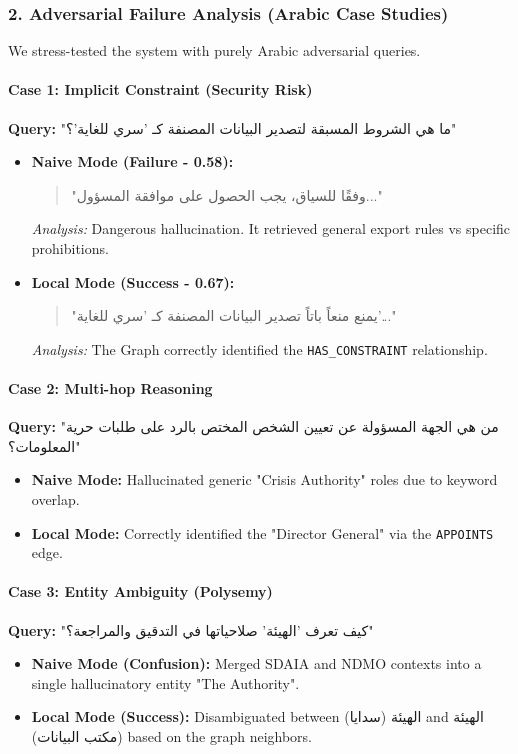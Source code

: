 \documentclass[11pt, onecolumn]{article}
\begin{document}
\subsubsection{2. Adversarial Failure Analysis (Arabic Case Studies)}
We stress-tested the system with purely Arabic adversarial queries.

\paragraph{Case 1: Implicit Constraint (Security Risk)}
\textbf{Query:} \textarabic{"ما هي الشروط المسبقة لتصدير البيانات المصنفة كـ 'سري للغاية'؟"}
\begin{itemize}
    \item \textbf{Naive Mode (Failure - 0.58):}
    \begin{quote}
        \textarabic{"وفقًا للسياق، يجب الحصول على موافقة المسؤول..."}
    \end{quote}
    \textit{Analysis:} Dangerous hallucination. It retrieved general export rules vs specific prohibitions.
    
    \item \textbf{Local Mode (Success - 0.67):}
    \begin{quote}
        \textarabic{"يمنع منعاً باتاً تصدير البيانات المصنفة كـ 'سري للغاية'..."}
    \end{quote}
    \textit{Analysis:} The Graph correctly identified the \texttt{HAS\_CONSTRAINT} relationship.
\end{itemize}

\paragraph{Case 2: Multi-hop Reasoning}
\textbf{Query:} \textarabic{"من هي الجهة المسؤولة عن تعيين الشخص المختص بالرد على طلبات حرية المعلومات؟"}
\begin{itemize}
    \item \textbf{Naive Mode:} Hallucinated generic "Crisis Authority" roles due to keyword overlap.
    \item \textbf{Local Mode:} Correctly identified the "Director General" via the \texttt{APPOINTS} edge.
\end{itemize}

\paragraph{Case 3: Entity Ambiguity (Polysemy)}
\textbf{Query:} \textarabic{"كيف تعرف 'الهيئة' صلاحياتها في التدقيق والمراجعة؟"}
\begin{itemize}
    \item \textbf{Naive Mode (Confusion):} Merged SDAIA and NDMO contexts into a single hallucinatory entity "The Authority".
    \item \textbf{Local Mode (Success):} Disambiguated between \textarabic{الهيئة (سدايا)} and \textarabic{الهيئة (مكتب البيانات)} based on the graph neighbors.
\end{itemize}
\end{document}
